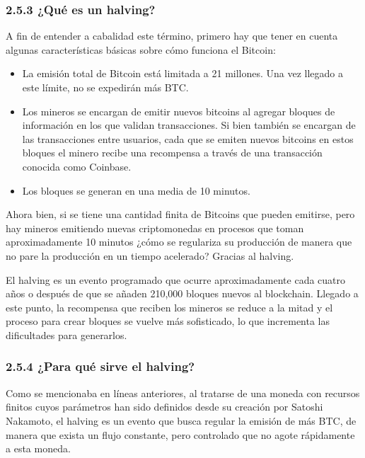 \documentclass[12pt,a4paper]{article}
\begin{document}
\subsubsection*{2.5.3 ¿Qué es un halving?}

A fin de entender a cabalidad este término, primero hay que tener en cuenta algunas
características básicas sobre cómo funciona el Bitcoin:

\begin{itemize}
    \item La emisión total de Bitcoin está limitada a 21 millones. Una vez llegado a este límite,
    no se expedirán más BTC.

    \item Los mineros se encargan de emitir nuevos bitcoins al agregar bloques de
    información en los que validan transacciones. Si bien también se encargan de las
    transacciones entre usuarios, cada que se emiten nuevos bitcoins en estos bloques
    el minero recibe una recompensa a través de una transacción conocida como
    Coinbase.

    \item Los bloques se generan en una media de 10 minutos.
\end{itemize}

Ahora bien, si se tiene una cantidad finita de Bitcoins que pueden emitirse, pero hay
mineros emitiendo nuevas criptomonedas en procesos que toman aproximadamente 10
minutos ¿cómo se regulariza su producción de manera que no pare la producción en un
tiempo acelerado? Gracias al halving.

El halving es un evento programado que ocurre aproximadamente cada cuatro años o
después de que se añaden 210,000 bloques nuevos al blockchain. Llegado a este punto, la
recompensa que reciben los mineros se reduce a la mitad y el proceso para crear bloques
se vuelve más sofisticado, lo que incrementa las dificultades para generarlos.

\subsubsection*{2.5.4 ¿Para qué sirve el halving?}

Como se mencionaba en líneas anteriores, al tratarse de una moneda con recursos finitos
cuyos parámetros han sido definidos desde su creación por Satoshi Nakamoto, el halving es
un evento que busca regular la emisión de más BTC, de manera que exista un flujo
constante, pero controlado que no agote rápidamente a esta moneda.
\end{document}
